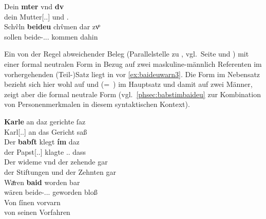 \begin{exe}
\begin{xlist}
	\end{xlist}

\ex \label{ex:mutterdu2}
	\gll Dein \textbf{mter} vnd \textbf{dv} \\
		dein Mutter[\Nom.\Sg.\FemF] und \Ssg\subM.\Nom{} \\
\sn \gll Schv̂ln \textbf{beideu} chv̂men {dar zvͦ} \\
		sollen beide-\Nom.\Pl.\NeutMF.\St{} kommen dahin \\
	\begin{taggedline}{\parencites(3/1 Wortformen, gleicher Teilsatz)[\pno~23\rc, 13--14]{kc:B1}}
	\trans {}
	\end{taggedline}
\end{exe}

\label{phsec:baideuwarn3}
Ein von der Regel abweichender Beleg (Parallelstelle zu \cite[\pno~75\rb,
3--4]{kc:C1}, vgl.~Seite \pageref{phsec:babstimbaideu} und
\pageref{phsec:baideuwarn}) mit einer formal neutralen Form in Bezug auf zwei
maskuline-männlich Referenten im vorhergehenden (Teil-)Satz liegt in
\citet{kc:K} vor \cref{ex:baideuwarn3}. Die Form  im Nebensatz
bezieht sich hier wohl auf
  und   (=~) im
Hauptsatz und damit auf zwei Männer, zeigt aber die formal neutrale Form
(vgl.~\cref{phsec:babstimbaideu} zur Kombination von Personenmerkmalen in
diesem syntaktischen Kontext).

\begin{exe}
\ex \label{ex:baideuwarn3}
	\gll \textbf{Karle} an daz gerichte ſaz \\
	    Karl[\Nom.\Sg.\MascM] an das Gericht saß \\
\sn \gll Der \textbf{babſt} klegt \textbf{ím} daz \\
		der Papst[\Nom.\Sg.\MascM] klagte \Tsg.\MascM.\Dat{} dass \\
\sn \gll Der wideme vnd der zehende gar \\
		der Stiftungen und der Zehnten gar \\
\sn \gll Waͤren \textbf{baid} worden bar \\
		wären beide-\Nom.\Pl.\NeutM.\St{} geworden bloß \\
\sn \gll Von ſínen vorvarn \\
		von seinen Vorfahren \\
	\begin{taggedline}{\parencites[\pno~85\vb, 21--25]{kc:K}[vgl. abweichend][14382--14386]{schroeder1895}}
	\trans {}
	\end{taggedline}
\end{exe}

